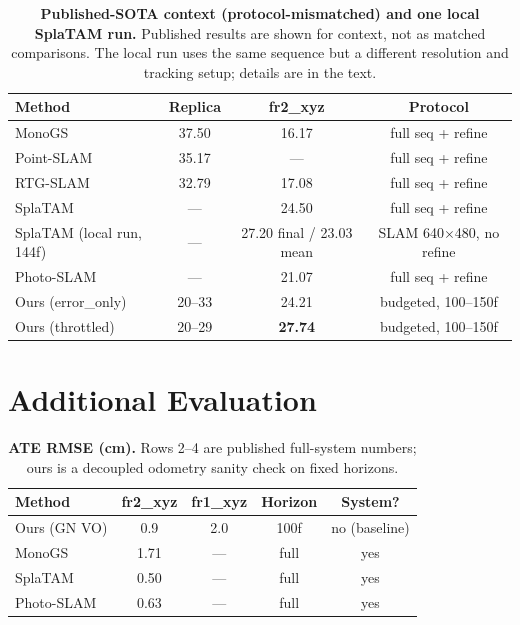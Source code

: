 \documentclass[10pt,twocolumn,letterpaper]{article}
\begin{document}
\begin{table}[t]
\centering
\footnotesize\setlength{\tabcolsep}{3pt}
\begin{tabular}{lccc}
\toprule
\textbf{Method} & \textbf{Replica} & \textbf{fr2\_xyz} & \textbf{Protocol} \\
\midrule
MonoGS & 37.50 & 16.17 & full seq + refine \\
Point-SLAM & 35.17 & --- & full seq + refine \\
RTG-SLAM & 32.79 & 17.08 & full seq + refine \\
SplaTAM & --- & 24.50 & full seq + refine \\
SplaTAM (local run, 144f) & --- & 27.20 final / 23.03 mean & SLAM 640$\times$480, no refine \\
Photo-SLAM & --- & 21.07 & full seq + refine \\
Ours (error\_only) & 20--33 & 24.21 & budgeted, 100--150f \\
Ours (throttled) & 20--29 & \textbf{27.74} & budgeted, 100--150f \\
\bottomrule
\end{tabular}
\caption{\textbf{Published-SOTA context (protocol-mismatched) and one local SplaTAM run.} Published results are shown for context, not as matched comparisons. The local run uses the same sequence but a different resolution and tracking setup; details are in the text.}
\label{tab:sota}
\end{table}

\section{Additional Evaluation}
\begin{table}[tbp]
\centering
\footnotesize\setlength{\tabcolsep}{3pt}
\begin{tabular}{lcccc}
\toprule
\textbf{Method} & \textbf{fr2\_xyz} & \textbf{fr1\_xyz} & \textbf{Horizon} & \textbf{System?} \\
\midrule
Ours (GN VO) & 0.9 & 2.0 & 100f & no (baseline) \\
MonoGS & 1.71 & --- & full & yes \\
SplaTAM & 0.50 & --- & full & yes \\
Photo-SLAM & 0.63 & --- & full & yes \\
\bottomrule
\end{tabular}
\caption{\textbf{ATE RMSE (cm).} Rows 2--4 are published full-system numbers; ours is a decoupled odometry sanity check on fixed horizons.}
\label{tab:ate}
\end{table}
\end{document}

